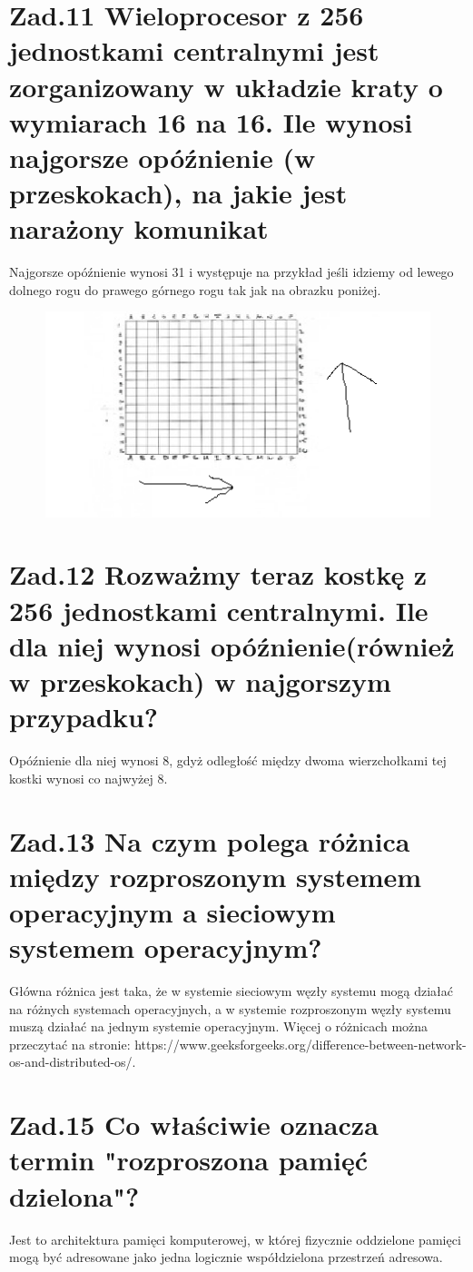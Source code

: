 \documentclass[10pt, a4paper]{article}
\begin{document}
\section*{Zad.11 Wieloprocesor z 256 jednostkami centralnymi jest zorganizowany w układzie kraty o wymiarach 16 na 16. Ile wynosi najgorsze opóźnienie (w przeskokach), na jakie jest narażony komunikat}
Najgorsze opóźnienie wynosi 31 i występuje na przykład jeśli idziemy od lewego dolnego rogu do prawego górnego rogu tak jak na obrazku poniżej.
\begin{figure}[h]
\includegraphics{grid.png}
\end{figure}
\section*{Zad.12 Rozważmy teraz kostkę z 256 jednostkami centralnymi. Ile dla niej wynosi opóźnienie(również w przeskokach) w najgorszym przypadku?}
Opóźnienie dla niej wynosi 8, gdyż odległość między dwoma wierzchołkami tej kostki wynosi co najwyżej 8.
\section*{Zad.13 Na czym polega różnica między rozproszonym systemem operacyjnym a sieciowym systemem operacyjnym?} 
Główna różnica jest taka, że w systemie sieciowym węzły systemu mogą działać na różnych systemach operacyjnych, a w systemie rozproszonym węzły systemu muszą działać na jednym systemie operacyjnym. Więcej o różnicach można przeczytać na stronie: https://www.geeksforgeeks.org/difference-between-network-os-and-distributed-os/.
\section*{Zad.15 Co właściwie oznacza termin "rozproszona pamięć dzielona"?}
Jest to architektura pamięci komputerowej, w której fizycznie oddzielone pamięci mogą być adresowane jako jedna logicznie współdzielona przestrzeń adresowa.
\end{document}
